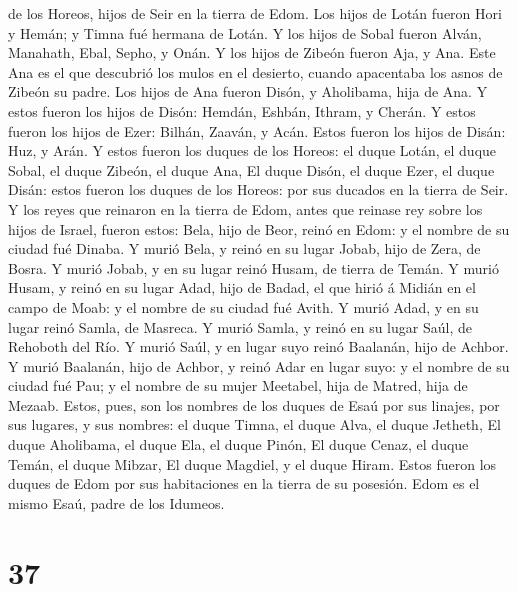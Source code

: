 de los Horeos, hijos de Seir en la tierra de Edom.  Los
hijos de Lotán fueron Hori y Hemán; y Timna fué hermana de Lotán.
 Y los hijos de Sobal fueron Alván, Manahath, Ebal,
Sepho, y Onán.  Y los hijos de Zibeón fueron Aja, y Ana.
Este Ana es el que descubrió los mulos en el desierto, cuando apacentaba
los asnos de Zibeón su padre.  Los hijos de Ana fueron
Disón, y Aholibama, hija de Ana.  Y estos fueron los
hijos de Disón: Hemdán, Eshbán, Ithram, y Cherán.  Y
estos fueron los hijos de Ezer: Bilhán, Zaaván, y Acán. 
Estos fueron los hijos de Disán: Huz, y Arán.  Y estos
fueron los duques de los Horeos: el duque Lotán, el duque Sobal, el
duque Zibeón, el duque Ana,  El duque Disón, el duque
Ezer, el duque Disán: estos fueron los duques de los Horeos: por sus
ducados en la tierra de Seir.  Y los reyes que reinaron
en la tierra de Edom, antes que reinase rey sobre los hijos de Israel,
fueron estos:  Bela, hijo de Beor, reinó en Edom: y el
nombre de su ciudad fué Dinaba.  Y murió Bela, y reinó en
su lugar Jobab, hijo de Zera, de Bosra.  Y murió Jobab, y
en su lugar reinó Husam, de tierra de Temán.  Y murió
Husam, y reinó en su lugar Adad, hijo de Badad, el que hirió á Midián en
el campo de Moab: y el nombre de su ciudad fué Avith.  Y
murió Adad, y en su lugar reinó Samla, de Masreca.  Y
murió Samla, y reinó en su lugar Saúl, de Rehoboth del Río.
 Y murió Saúl, y en lugar suyo reinó Baalanán, hijo de
Achbor.  Y murió Baalanán, hijo de Achbor, y reinó Adar
en lugar suyo: y el nombre de su ciudad fué Pau; y el nombre de su mujer
Meetabel, hija de Matred, hija de Mezaab.  Estos, pues,
son los nombres de los duques de Esaú por sus linajes, por sus lugares,
y sus nombres: el duque Timna, el duque Alva, el duque Jetheth,
 El duque Aholibama, el duque Ela, el duque Pinón,
 El duque Cenaz, el duque Temán, el duque Mibzar,
 El duque Magdiel, y el duque Hiram. Estos fueron los
duques de Edom por sus habitaciones en la tierra de su posesión. Edom es
el mismo Esaú, padre de los Idumeos.

\hypertarget{section-36}{%
\section{37}\label{section-36}}

